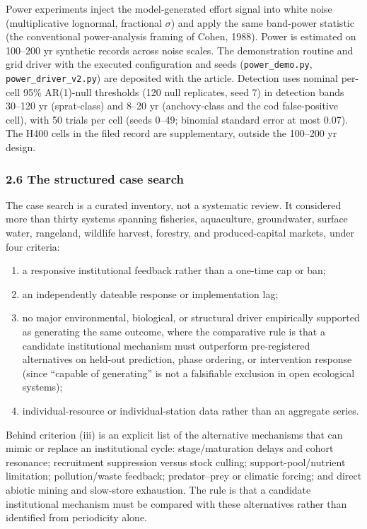 \documentclass[11pt]{article}
\providecommand{\tightlist}{\setlength{\itemsep}{0pt}\setlength{\parskip}{0pt}}
\begin{document}
Power experiments inject the model-generated effort signal into
white noise (multiplicative lognormal, fractional \(\sigma\)) and apply the same band-power statistic (the
conventional power-analysis framing of Cohen, 1988). Power is estimated
on 100--200 yr synthetic records across noise scales. The demonstration
routine and grid driver with the executed configuration and seeds
(\texttt{power\_demo.py}, \texttt{power\_driver\_v2.py}) are deposited
with the article. Detection uses nominal per-cell 95\% AR(1)-null thresholds (120 null replicates, seed 7) in detection bands 30--120 yr (sprat-class) and 8--20 yr (anchovy-class and the cod false-positive cell), with 50 trials per cell (seeds 0--49; binomial standard error at most 0.07). The H400 cells in the filed record are supplementary, outside the 100--200 yr design.

\subsubsection{2.6 The structured case
search}\label{the-structured-case-search}

The case search is a curated inventory, not a systematic review.
It considered more than thirty systems spanning fisheries, aquaculture,
groundwater, surface water, rangeland, wildlife harvest, forestry, and
produced-capital markets, under four criteria:

\begin{enumerate}
\def\labelenumi{(\roman{enumi})}
\tightlist
\item
  a responsive institutional feedback rather than a one-time cap or ban;
\item
  an independently dateable response or implementation lag;
\item
  no major environmental, biological, or structural driver empirically
  supported as generating the same outcome, where the comparative rule
  is that a candidate institutional mechanism must outperform
  pre-registered alternatives on held-out prediction, phase ordering, or
  intervention response (since ``capable of generating'' is not a
  falsifiable exclusion in open ecological systems);
\item
  individual-resource or individual-station data rather than an
  aggregate series.
\end{enumerate}

Behind criterion (iii) is an explicit list of the alternative
mechanisms that can mimic or replace an institutional cycle:
stage/maturation delays and cohort resonance; recruitment suppression
versus stock culling; support-pool/nutrient limitation; pollution/waste
feedback; predator--prey or climatic forcing; and direct abiotic mining
and slow-store exhaustion. The rule is that a candidate institutional
mechanism must be compared with these alternatives rather than
identified from periodicity alone.
\end{document}
